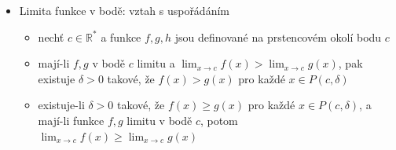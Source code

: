 \begin{itemize}
\begin{itemize}
\begin{itemize}
\item zapisujeme $\lim_{x\to a}f(x)=A$
\item poznámka: limita funkce $f$ v bodě $a$ nezávisí na její hodnota v $a$, funkce $f$ dokonce ani nemusí být v $a$ definovaná
\item pokud místo prstencového okolí $P$ použijeme pravé prstencové okolí $P^+$, dostaneme definici limity zprava, značí se $\lim_{x\to a^+}f(x)$
\begin{itemize}
\item obdobně lze definovat limitu zleva
\item pokud $\lim_{x\to a^+}f(x)=\lim_{x\to a^-}f(x)=A$, pak $\lim_{x\to a}f(x)=A$
\item naopak pokud jsou limity zprava a zleva různé, limita neexistuje
\end{itemize}
\item podobně jako u posloupnosti - pokud limita funkce existuje, je jednoznačně určena
\item limitu funkce lze rovněž definovat pomocí posloupnosti
\end{itemize}
\item aritmetika limit
\begin{itemize}
\item nechť $a,A,B\in\mathbb R^*$, nechť $f,g$ jsou funkce definované na nějakém prstencovém okolí $P(a,\delta)$ bodu $a$, nechť platí $\lim_{x\to a}f(x)=A$ a $\lim_{x\to a}g(x)=B$
\item pak platí $\lim_{x\to a}f(x)+g(x)=A+B$, je-li tento součet definován
\item $\lim_{x\to a}f(x)g(x)=AB$, je-li tento součin definován
\item pokud je $g(x)$ nenulová na nějakém prstencovém okolí bodu $a$, pak $\lim_{x\to a}f(x)/g(x)=A/B$, je-li tento podíl definován
\end{itemize}
\end{itemize}
\item Limita funkce v bodě: vztah s uspořádáním
\begin{itemize}
\item nechť $c\in\mathbb R^*$ a funkce $f,g,h$ jsou definované na prstencovém okolí bodu $c$
\item mají-li $f,g$ v bodě $c$ limitu a $\lim_{x\to c}f(x)\gt\lim_{x\to c}g(x)$, pak existuje $\delta\gt 0$ takové, že $f(x)\gt g(x)$ pro každé $x\in P(c,\delta)$
\item existuje-li $\delta\gt 0$ takové, že $f(x)\geq g(x)$ pro každé $x\in P(c,\delta)$, a mají-li funkce $f,g$ limitu v bodě $c$, potom $\lim_{x\to c}f(x)\geq \lim_{x\to c}g(x)$

\end{itemize}
\end{itemize}
